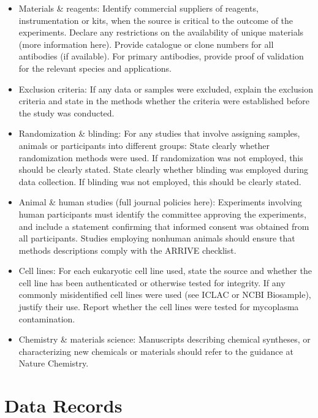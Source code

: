 \documentclass[fleqn,10pt]{wlscirep}
\begin{document}
\begin{itemize}
  \item
  Materials \& reagents:
  Identify commercial suppliers of reagents, instrumentation or kits, when the source is critical to the outcome of the experiments.
  Declare any restrictions on the availability of unique materials (more information here).
  Provide catalogue or clone numbers for all antibodies (if available). For primary antibodies, provide proof of validation for the relevant species and applications.
  
  \item
  Exclusion criteria: If any data or samples were excluded, explain the exclusion criteria and state in the methods whether the criteria were established before the study was conducted.
  
  \item
  Randomization \& blinding: For any studies that involve assigning samples, animals or participants into different groups:
  State clearly whether randomization methods were used. If randomization was not employed, this should be clearly stated.
  State clearly whether blinding was employed during data collection. If blinding was not employed, this should be clearly stated.
  
  \item
  Animal \& human studies (full journal policies here):
  Experiments involving human participants must identify the committee approving the experiments, and include a statement confirming that informed consent was obtained from all participants.
  Studies employing nonhuman animals should ensure that methods descriptions comply with the ARRIVE checklist.
  
  \item
  Cell lines:
  For each eukaryotic cell line used, state the source and whether the cell line has been authenticated or otherwise tested for integrity.
  If any commonly misidentified cell lines were used (see ICLAC or NCBI Biosample), justify their use.
  Report whether the cell lines were tested for mycoplasma contamination.
  
  \item
  Chemistry \& materials science: Manuscripts describing chemical syntheses, or characterizing new chemicals or materials should refer to the guidance at Nature Chemistry.
  
\end{itemize}
\fi

\section*{Data Records}\label{sec-data-records}
\end{document}

